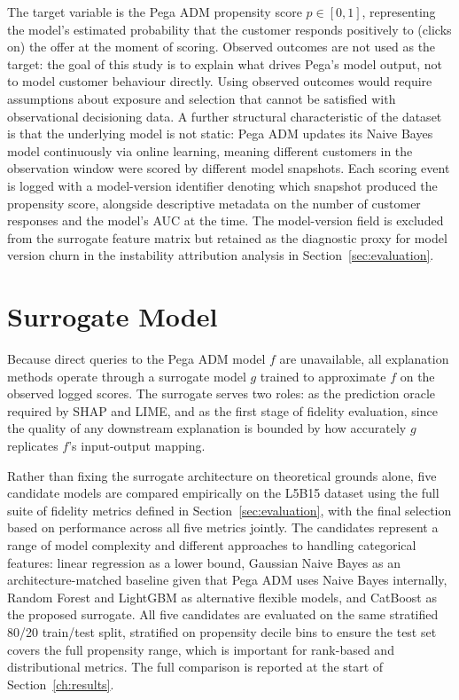 \documentclass[oneside]{memoir} %
\begin{document}
The target variable is the Pega ADM propensity score $p \in [0,1]$, representing the model's estimated probability that the customer responds positively to (clicks on) the offer at the moment of scoring. Observed outcomes are not used as the target: the goal of this study is to explain what drives Pega's model output, not to model customer behaviour directly. Using observed outcomes would require assumptions about exposure and selection that cannot be satisfied with observational decisioning data. A further structural characteristic of the dataset is that the underlying model is not static: Pega ADM updates its Naive Bayes model continuously via online learning, meaning different customers in the observation window were scored by different model snapshots. Each scoring event is logged with a model-version identifier denoting which snapshot produced the propensity score, alongside descriptive metadata on the number of customer responses and the model's AUC at the time. The model-version field is excluded from the surrogate feature matrix but retained as the diagnostic proxy for model version churn in the instability attribution analysis in Section~\ref{sec:evaluation}.

\section{Surrogate Model} \label{sec:surrogate}

Because direct queries to the Pega ADM model $f$ are unavailable, all explanation methods operate through a surrogate model $g$ trained to approximate $f$ on the observed logged scores. The surrogate serves two roles: as the prediction oracle required by SHAP and LIME, and as the first stage of fidelity evaluation, since the quality of any downstream explanation is bounded by how accurately $g$ replicates $f$'s input-output mapping.

Rather than fixing the surrogate architecture on theoretical grounds alone, five candidate models are compared empirically on the L5B15 dataset using the full suite of fidelity metrics defined in Section~\ref{sec:evaluation}, with the final selection based on performance across all five metrics jointly. The candidates represent a range of model complexity and different approaches to handling categorical features: linear regression as a lower bound, Gaussian Naive Bayes as an architecture-matched baseline given that Pega ADM uses Naive Bayes internally, Random Forest and LightGBM as alternative flexible models, and CatBoost \parencite{prokhorenkova_catboost_2019} as the proposed surrogate. All five candidates are evaluated on the same stratified 80/20 train/test split, stratified on propensity decile bins to ensure the test set covers the full propensity range, which is important for rank-based and distributional metrics. The full comparison is reported at the start of Section~\ref{ch:results}.
\end{document}
